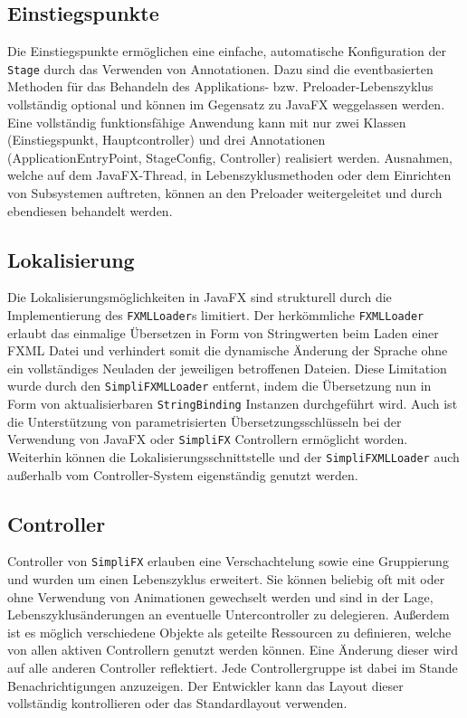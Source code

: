 \subsection{Einstiegspunkte}
Die Einstiegspunkte ermöglichen eine einfache, automatische Konfiguration der \texttt{Stage} durch das Verwenden von Annotationen. Dazu sind die eventbasierten Methoden für das Behandeln des Applikations- bzw. Preloader-Lebenszyklus vollständig optional und können im Gegensatz zu JavaFX weggelassen werden. Eine vollständig funktionsfähige Anwendung kann mit nur zwei Klassen (Einstiegspunkt, Hauptcontroller) und drei Annotationen (ApplicationEntryPoint, StageConfig, Controller) realisiert werden. Ausnahmen, welche auf dem JavaFX-Thread, in Lebenszyklusmethoden oder dem Einrichten von Subsystemen auftreten, können an den Preloader weitergeleitet und durch ebendiesen behandelt werden. 
\subsection{Lokalisierung}
Die Lokalisierungsmöglichkeiten in JavaFX sind strukturell durch die Implementierung des \texttt{FXMLLoader}s limitiert. Der herkömmliche \texttt{FXMLLoader} erlaubt das einmalige Übersetzen in Form von Stringwerten beim Laden einer FXML Datei und verhindert somit die dynamische Änderung der Sprache ohne ein vollständiges Neuladen der jeweiligen betroffenen Dateien. Diese Limitation wurde durch den \texttt{SimpliFXMLLoader} entfernt, indem die Übersetzung nun in Form von aktualisierbaren \texttt{StringBinding} Instanzen durchgeführt wird. Auch ist die Unterstützung von parametrisierten Übersetzungsschlüsseln bei der Verwendung von JavaFX oder \texttt{SimpliFX} Controllern ermöglicht worden. Weiterhin können die Lokalisierungsschnittstelle und der \texttt{SimpliFXMLLoader} auch außerhalb vom Controller-System eigenständig genutzt werden.
\subsection{Controller}
Controller von \texttt{SimpliFX} erlauben eine Verschachtelung sowie eine Gruppierung und wurden um einen Lebenszyklus erweitert. Sie können beliebig oft mit oder ohne Verwendung von Animationen gewechselt werden und sind in der Lage, Lebenszyklusänderungen an eventuelle Untercontroller zu delegieren. Außerdem ist es möglich verschiedene Objekte als geteilte Ressourcen zu definieren, welche von allen aktiven Controllern genutzt werden können. Eine Änderung dieser wird auf alle anderen Controller reflektiert. Jede Controllergruppe ist dabei im Stande Benachrichtigungen anzuzeigen. Der Entwickler kann das Layout dieser vollständig kontrollieren oder das Standardlayout verwenden.
